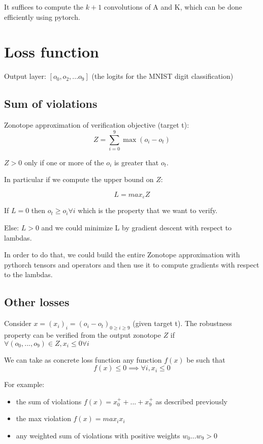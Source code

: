 \documentclass{article}
\newcommand{\eps}{\varepsilon}
\begin{document}
It suffices to compute the $k+1$ convolutions of A and K, which can be done efficiently using pytorch.



\section{Loss function}

Output layer: $[o_0, o_2, ... o_9]$ (the logits for the MNIST digit classification)

\subsection{Sum of violations}

Zonotope approximation of verification objective (target t):
\begin{equation*}
Z = \sum_{i=0}^{9} \max(o_i - o_t)
\end{equation*}

$Z > 0$ only if one or more of the $o_i$ is greater that $o_t$.

In particular if we compute the upper bound on $Z$:

\begin{equation*}
L = max_\eps Z
\end{equation*}

If $L = 0$ then $o_t \geq o_i \forall i$ which is the property that we want to verify.

Else: $L > 0$ and we could minimize L by gradient descent with respect to lambdas.

In order to do that, we could build the entire Zonotope approximation with pythorch tensors and operators and then use it to compute gradients with respect to the lambdas.

\subsection{Other losses}

Consider $x = (x_i)_i = (o_i - o_t)_{0 \geq i \geq 9}$ (given target t). 
The robustness property can be verified from the output zonotope $Z$ if $\forall (o_0, ..., o_9) \in Z, x_i \leq 0 \forall i$

We can take as concrete loss function any function $f(x)$ be such that
\begin{equation*}
f(x) \leq 0 \implies \forall i, x_i \leq 0
\end{equation*}

For example:
\begin{itemize}
\item the sum of violations $f(x) = x_0^+ + ... + x_9^+$ as described previously
\item the max violation $f(x) = max_i x_i$
\item any weighted sum of violations with positive weights $w_0 ... w_9 > 0$
\end{itemize}
\end{document}
